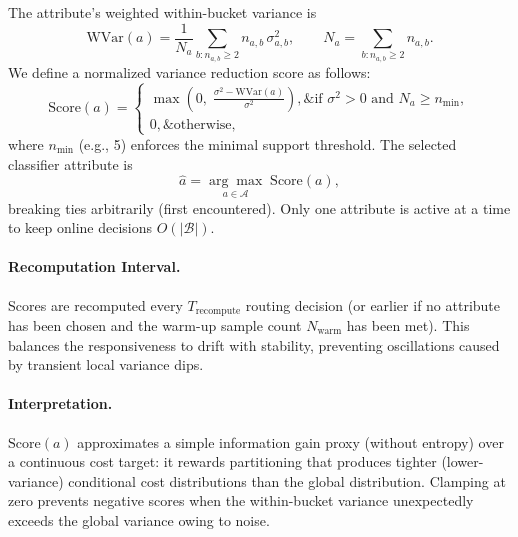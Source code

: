 The attribute's weighted within-bucket variance is
\[
\mathrm{WVar}(a) = \frac{1}{N_a} \sum_{b: n_{a,b} \ge 2} n_{a,b} \,\sigma_{a,b}^2,
\qquad N_a = \sum_{b: n_{a,b} \ge 2} n_{a,b}.
\]
We define a normalized variance reduction score as follows:
\[
\mathrm{Score}(a) =
\begin{cases}
\displaystyle \max\left(0,\; \frac{\sigma^2 - \mathrm{WVar}(a)}{\sigma^2}\right),\& \text{if } \sigma^2 > 0 \text{ and } N_a \ge n_{\min},\\[8pt]
0,\& \text{otherwise},
\end{cases}
\]
where $n_{\min}$ (e.g., 5) enforces the minimal support threshold. The selected classifier attribute is
\[
\hat{a} = \underset{a \in \mathcal{A}}{\arg\max}\; \mathrm{Score}(a),
\]
breaking ties arbitrarily (first encountered). Only one attribute is active at a time to keep online decisions $O(|\mathcal{B}|)$.

\paragraph{Recomputation Interval.}
Scores are recomputed every $T_{\text{recompute}}$ routing decision (or earlier if no attribute has been chosen and the warm-up sample count $N_{\text{warm}}$ has been met). This balances the responsiveness to drift with stability, preventing oscillations caused by transient local variance dips.

\paragraph{Interpretation.}
$\mathrm{Score}(a)$ approximates a simple information gain proxy (without entropy) over a continuous cost target: it rewards partitioning that produces tighter (lower-variance) conditional cost distributions than the global distribution. Clamping at zero prevents negative scores when the within-bucket variance unexpectedly exceeds the global variance owing to noise.


